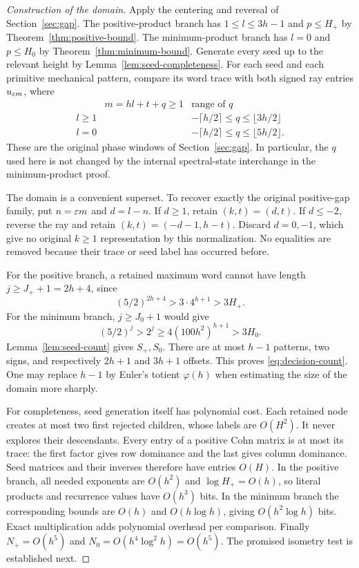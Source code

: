 \begin{proof}[Construction of the domain]
Apply the centering and reversal of Section~\ref{sec:gap}.
The positive-product branch has $1\leqslant l\leqslant3h-1$ and
$p\leqslant H_+$ by Theorem~\ref{thm:positive-bound}. The minimum-product
branch has $l=0$ and $p\leqslant H_0$ by
Theorem~\ref{thm:minimum-bound}. Generate every seed up to the relevant
height by Lemma~\ref{lem:seed-completeness}. For each seed and each
primitive mechanical pattern, compare its word trace with both signed
ray entries $u_{\varepsilon m}$, where
\begin{equation}\label{eq:decision-phase-domain}
 \begin{array}{c|c|c}
 &m=hl+t+q\geqslant1&\text{range of }q\\ \hline
 l\geqslant1&&-\lceil h/2\rceil\leqslant q\leqslant\lfloor3h/2\rfloor\\
 l=0&&-\lceil h/2\rceil\leqslant q\leqslant\lfloor5h/2\rfloor.
 \end{array}
\end{equation}
These are the original phase windows of Section~\ref{sec:gap}.
In particular, the $q$ used here is not changed by the internal
spectral-state interchange in the minimum-product proof.

The domain is a convenient superset. To recover exactly the original
positive-gap family, put $n=\varepsilon m$ and $d=l-n$. If $d\geqslant1$,
retain $(k,t)=(d,t)$. If $d\leqslant-2$, reverse the ray and retain
$(k,t)=(-d-1,h-t)$. Discard $d=0,-1$, which give no original
$k\geqslant1$ representation by this normalization. No equalities are
removed because their trace or seed label has occurred before.

For the positive branch, a retained maximum word cannot have length
$j\geqslant J_++1=2h+4$, since
$$
 (5/2)^{2h+4}>3\cdot4^{h+1}>3H_+.
$$
For the minimum branch, $j\geqslant J_0+1$ would give
$$
 (5/2)^j>2^j\geqslant4(100h^2)^{h+1}>3H_0.
$$
Lemma~\ref{lem:seed-count} gives $S_+,S_0$. There are at most $h-1$
patterns, two signs, and respectively $2h+1$ and $3h+1$ offsets.
This proves \eqref{eq:decision-count}. One may replace $h-1$ by
Euler's totient $\varphi(h)$ when estimating the size of the domain more sharply.

For completeness, seed generation itself has polynomial cost. Each
retained node creates at most two first rejected children, whose labels
are $O(H^2)$. It never explores their descendants. Every entry of a
positive Cohn matrix is at most its trace: the first factor gives row
dominance and the last gives column dominance. Seed matrices and their
inverses therefore have entries $O(H)$. In the positive branch, all
needed exponents are $O(h^2)$ and $\log H_+=O(h)$, so literal products
and recurrence values have $O(h^3)$ bits. In the minimum branch the
corresponding bounds are $O(h)$ and $O(h\log h)$, giving
$O(h^2\log h)$ bits. Exact multiplication adds polynomial overhead
per comparison. Finally
$N_+=O(h^5)$ and $N_0=O(h^4\log^2h)=O(h^5)$.
The promised isometry test is established next.
\end{proof}

